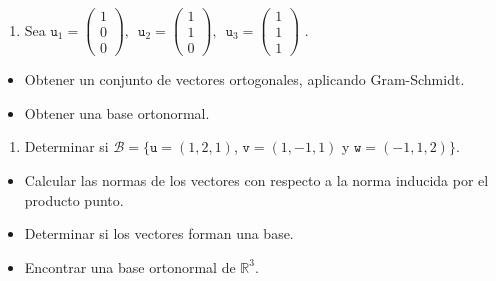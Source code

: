 \documentclass[
]{article}
\providecommand{\tightlist}{%
  \setlength{\itemsep}{0pt}\setlength{\parskip}{0pt}}
\begin{document}
\begin{enumerate}
\def\labelenumi{\arabic{enumi}.}
\setcounter{enumi}{5}
\tightlist
\item
  Sea \(\mathtt{u}_1=\begin{pmatrix} 1 \\ 0 \\ 0 \end{pmatrix},\,\)
  \(\mathtt{u}_2=\begin{pmatrix} 1 \\ 1 \\ 0 \end{pmatrix},\,\)
  \(\mathtt{u}_3=\begin{pmatrix} 1 \\ 1 \\ 1 \end{pmatrix}\) .
\end{enumerate}

\begin{itemize}
\item
  Obtener un conjunto de vectores ortogonales, aplicando Gram-Schmidt.
\item
  Obtener una base ortonormal.
\end{itemize}

\begin{enumerate}
\def\labelenumi{\arabic{enumi}.}
\setcounter{enumi}{6}
\tightlist
\item
  Determinar si \(\mathcal{B} = \{\mathtt{u}=(1,2,1)\),
  \(\mathtt{v}=(1,-1,1)\) y \(\mathtt{w}=(-1,1,2) \}\).
\end{enumerate}

\begin{itemize}
\item
  Calcular las normas de los vectores con respecto a la norma inducida
  por el producto punto.
\item
  Determinar si los vectores forman una base.
\item
  Encontrar una base ortonormal de \(\mathbb{R}^3\).
\end{itemize}
\end{document}
